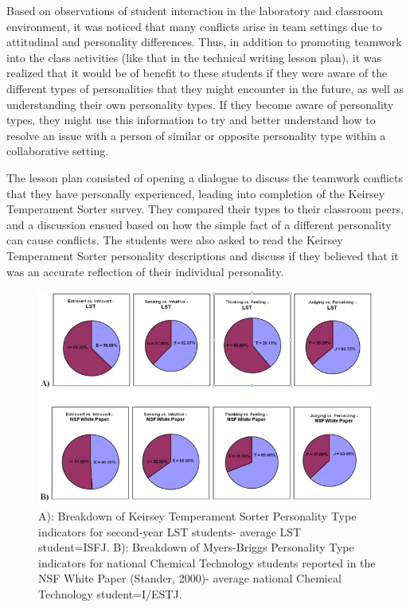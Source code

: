 \documentclass[11.5pt]{sig-alternate} %
\begin{document}
\begin{large}
Based on observations of student interaction in the laboratory and classroom environment, it was noticed that many conflicts arise in team settings due to attitudinal and personality differences. Thus, in addition to promoting teamwork into the class activities (like that in the technical writing lesson plan), it was realized that it would be of benefit to these students if they were aware of the different types of personalities that they might encounter in the future, as well as understanding their own personality types. If they become aware of personality types, they might use this information to try and better understand how to resolve an issue with a person of similar or opposite personality type within a collaborative setting.

The lesson plan consisted of opening a dialogue to discuss the teamwork conflicts that they have personally experienced, leading into completion of the Keirsey Temperament Sorter survey. They compared their types to their classroom peers, and a discussion ensued based on how the simple fact of a different personality can cause conflicts. The students were also asked to read the Keirsey Temperament Sorter personality descriptions and discuss if they believed that it was an accurate reflection of their individual personality.

\begin{figure}[th]
    \centering
    \includegraphics[width=1\textwidth]{images/fig3.png}
    \caption{A): Breakdown of Keirsey Temperament Sorter Personality Type indicators for second-year LST students- average LST student=ISFJ. B): Breakdown of Myers-Briggs Personality Type indicators for national Chemical Technology students reported in the NSF White Paper (Stander, 2000)- average national Chemical Technology student=I/ESTJ.}
\end{figure}


\end{large}
\end{document}
